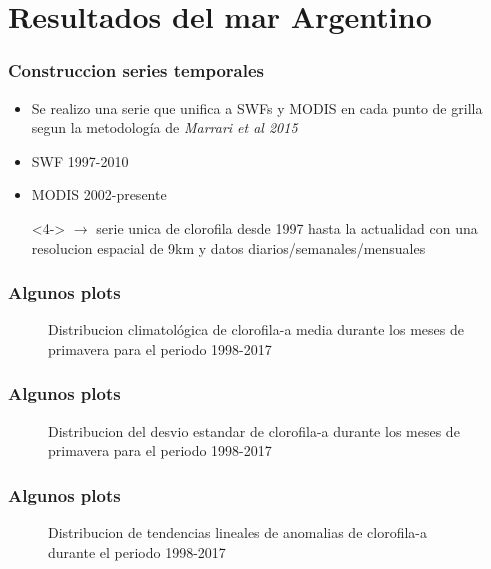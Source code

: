 \documentclass{beamer}
\begin{document}
\section{Resultados del mar Argentino}
\begin{frame}
	
\frametitle{Construccion series temporales}

\begin{itemize}
	\item<1-> Se realizo una serie que unifica a SWFs y MODIS en cada punto de grilla segun la metodología de \textit{Marrari et al 2015}
	\item<2-> SWF 1997-2010 
	\item<3-> MODIS 2002-presente
	\item[]<4-> $\rightarrow$ serie unica de clorofila desde 1997 hasta la actualidad con una resolucion espacial de 9km y datos diarios/semanales/mensuales
\end{itemize}

\end{frame}

\begin{frame}
	
\frametitle{Algunos plots}
\begin{figure}
	\caption{Distribucion climatológica de clorofila-a media durante los meses de primavera para el periodo 1998-2017}
\end{figure}
	
\end{frame}

\begin{frame}
	
	\frametitle{Algunos plots}
	\begin{figure}
	\caption{Distribucion del desvio estandar de clorofila-a durante los meses de primavera para el periodo 1998-2017}
	\end{figure}

\end{frame}

\begin{frame}
	
	\frametitle{Algunos plots}
	\begin{figure}
	\caption{Distribucion de tendencias lineales de anomalias de clorofila-a durante el periodo 1998-2017}	
	\end{figure}

\end{frame}
\end{document}
